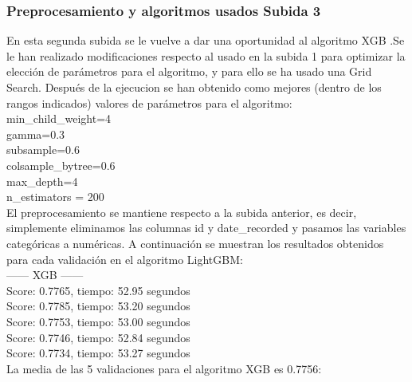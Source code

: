 	
	\subsubsection[Preprocesamiento y algoritmos usados Subida 3]{Preprocesamiento y algoritmos usados Subida 3}
	
	En esta segunda subida se le vuelve a dar una oportunidad al algoritmo XGB .Se le han realizado
	modificaciones respecto al usado en la subida 1 para optimizar la elección de parámetros para el algoritmo, 
	y para ello se ha usado una Grid Search. Después de la ejecucion se han obtenido como mejores (dentro de los 
	rangos indicados) valores de parámetros para el algoritmo: \\
	
	min\_child\_weight=4\\
	gamma=0.3\\
	subsample=0.6\\
	colsample\_bytree=0.6\\
	max\_depth=4\\
	n\_estimators = 200\\
	
	El preprocesamiento se mantiene respecto a la subida anterior, es decir, simplemente eliminamos las columnas id y date\_recorded  y pasamos las variables 
	categóricas a numéricas. A continuación se muestran los resultados obtenidos para cada validación en el algoritmo LightGBM: \\
	
	------ XGB ------\\
	Score: 0.7765, tiempo:  52.95 segundos \\ 
	Score: 0.7785, tiempo:  53.20 segundos \\
	Score: 0.7753, tiempo:  53.00 segundos \\
	Score: 0.7746, tiempo:  52.84 segundos \\
	Score: 0.7734, tiempo:  53.27 segundos \\
	
	La media de las 5 validaciones para el algoritmo XGB es 0.7756:  \\

	
